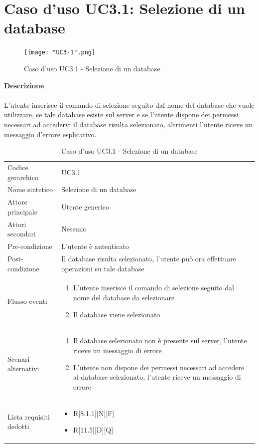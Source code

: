 \documentclass[a4paper]{report}
\begin{document}
	 \section{Caso d'uso UC3.1: Selezione di un database}
	 	\begin{figure}[H]
			\centering
			\texttt{[image: "UC3-1".png]}
			\caption{Caso d'uso UC3.1 - Selezione di un database}
		\end{figure}
	 \textbf{Descrizione} \\ \\
	 L'utente inserisce il comando di selezione seguito dal nome del database che vuole utilizzare, se tale
	  database esiste sul server e se l'utente dispone dei permessi necessari ad accedervi il database risulta
	   selezionato, altrimenti l'utente riceve un messaggio d'errore esplicativo.
		\begin{table}[H]
		\begin{tabularx}{\textwidth}{X | X}\toprule
			\rowcolor{orange!65}Codice gerarchico & UC3.1 \\
			Nome sintetico & Selezione di un database \\
			\rowcolor{orange!65}Attore principale & Utente generico\\
			Attori secondari & Nessuno \\
			\rowcolor{orange!65}Pre-condizione & L'utente è autenticato\\
			Post-condizione & Il database risulta selezionato, l'utente può ora effettuare operazioni su tale
			database \\
			\rowcolor{orange!65}Flusso eventi & \begin{enumerate}
			\item L'utente inserisce il comando di selezione seguito dal nome del database da selezionare
			\item Il database viene selezionato
			\end{enumerate} \\
			Scenari alternativi &  \begin{enumerate}
			\item Il database selezionato non è presente sul server, l'utente riceve un messaggio di errore
			\item L'utente non dispone dei permessi necessari ad accedere al database selezionato, l'utente
			riceve un messaggio di errore
			\end{enumerate}			 \\
			\rowcolor{orange!65}Lista requisiti dedotti & \begin{itemize}
				\item R[8.1.1][N][F]
				\item R[11.5][D][Q]
				\end{itemize} \\
			\bottomrule
		\end{tabularx}
		\caption{Caso d'uso UC3.1 - Selezione di un database}
	 \end{table}
\end{document}
